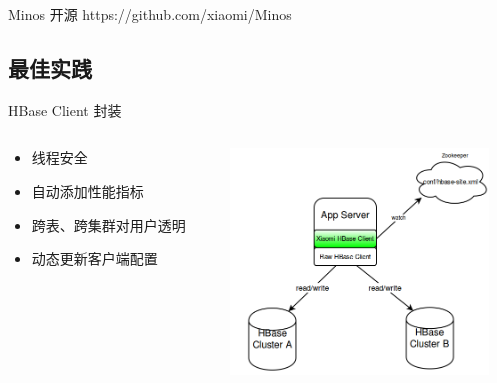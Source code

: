 \documentclass[xcolor=table]{beamer}
\begin{document}
\begin{CJK}{UTF8}{gkai}
\begin{frame}{Minos}
	\center	开源 https://github.com/xiaomi/Minos \\

\end{frame}

\subsection{最佳实践}

\begin{frame}{\subsecname}
	HBase Client 封装 \\
	\begin{columns}
	\begin{column}{0.4\textwidth}
		\begin{itemize}
		\item 线程安全
		\item 自动添加性能指标
		\item 跨表、跨集群对用户透明
		\item 动态更新客户端配置
		\end{itemize}
	\end{column}
	\begin{column}{0.6\textwidth}
	\includegraphics[width=\textwidth, height=6cm]{hbase-client.png}
	\end{column}
\end{columns}

\end{frame}


\end{CJK}
\end{document}
